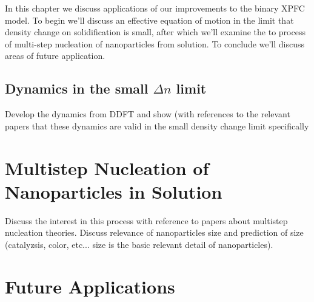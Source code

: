 \label{chapter:applications}

In this chapter we discuss applications of our improvements to the binary XPFC model.
To begin we'll discuss an effective equation of motion in the limit that density 
change on solidification is small, after which we'll examine the to process of
multi-step nucleation of nanoparticles from solution. To conclude we'll discuss
areas of future application.

\subsection{Dynamics in the small $\Delta n$ limit} %

{
    \color{ForestGreen} Develop the dynamics from DDFT and show (with references
    to the relevant papers that these dynamics are valid in the small density
    change limit specifically
}

\section{Multistep Nucleation of Nanoparticles in Solution} %

{
    \color{ForestGreen} Discuss the interest in this process with reference to 
    papers about multistep nucleation theories. Discuss relevance of nanoparticles
    size and prediction of size (catalyzsis, color, etc... size is the basic relevant
    detail of nanoparticles).
}

\section{Future Applications} %

